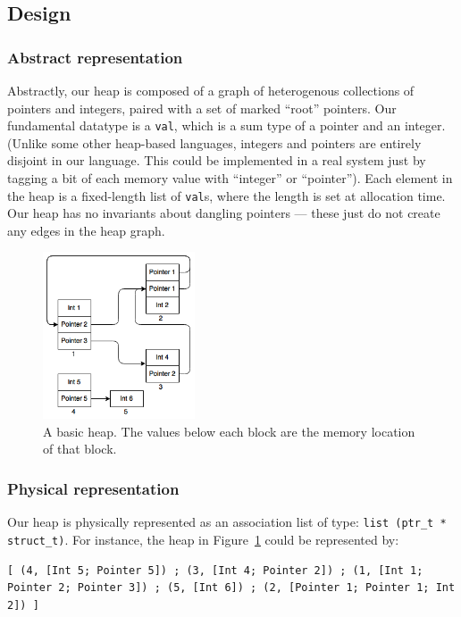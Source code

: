 \documentclass{article}
\begin{document}
\subsection{Design}
\subsubsection{Abstract representation}
Abstractly, our heap is composed of a graph of heterogenous collections of pointers and integers, paired with a set of marked ``root'' pointers. Our fundamental datatype is a \texttt{val}, which is a sum type of a pointer and an integer. (Unlike some other heap-based languages, integers and pointers are entirely disjoint in our language. This could be implemented in a real system just by tagging a bit of each memory value with ``integer'' or ``pointer''). Each element in the heap is a fixed-length list of \texttt{val}s, where the length is set at allocation time. Our heap has no invariants about dangling pointers --- these just do not create any edges in the heap graph.

\begin{figure}[H]
    \centering
    \includegraphics[width=0.4\textwidth]{report/images/heapBasic}
    \caption{A basic heap. The values below each block are the memory location of that block.}
    \label{fig:basic-heap}
\end{figure}

\subsubsection{Physical representation}
Our heap is physically represented as an association list of type:
\mbox{\lstinline|list (ptr_t * struct_t)|}. For instance, the heap in Figure~\ref{fig:basic-heap} could be represented by:

\begin{lstlisting}
[ (4, [Int 5; Pointer 5]) ; (3, [Int 4; Pointer 2]) ; (1, [Int 1; Pointer 2; Pointer 3]) ; (5, [Int 6]) ; (2, [Pointer 1; Pointer 1; Int 2]) ]
\end{lstlisting}
\end{document}

